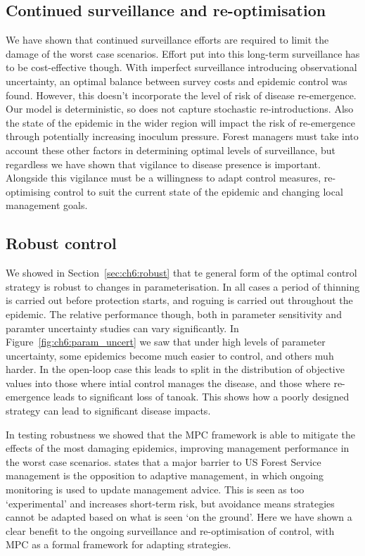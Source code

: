 \subsection{Continued surveillance and re-optimisation}

We have shown that continued surveillance efforts are required to limit the damage of the worst case scenarios. Effort put into this long-term surveillance has to be cost-effective though. With imperfect surveillance introducing observational uncertainty, an optimal balance between survey costs and epidemic control was found. However, this doesn't incorporate the level of risk of disease re-emergence. Our model is deterministic, so does not capture stochastic re-introductions. Also the state of the epidemic in the wider region will impact the risk of re-emergence through potentially increasing inoculum pressure. Forest managers must take into account these other factors in determining optimal levels of surveillance, but regardless we have shown that vigilance to disease presence is important. Alongside this vigilance must be a willingness to adapt control measures, re-optimising control to suit the current state of the epidemic and changing local management goals.

\subsection{Robust control}

We showed in Section~\ref{sec:ch6:robust} that te general form of the optimal control strategy is robust to changes in parameterisation. In all cases a period of thinning is carried out before protection starts, and roguing is carried out throughout the epidemic. The relative performance though, both in parameter sensitivity and paramter uncertainty studies can vary significantly. In Figure~\ref{fig:ch6:param_uncert} we saw that under high levels of parameter uncertainty, some epidemics become much easier to control, and others muh harder. In the open-loop case this leads to split in the distribution of objective values into those where intial control manages the disease, and those where re-emergence leads to significant loss of tanoak. This shows how a poorly designed strategy can lead to significant disease impacts.

In testing robustness we showed that the MPC framework is able to mitigate the effects of the most damaging epidemics, improving management performance in the worst case scenarios. \citet{maccleery_reinventing_2015} states that a major barrier to US Forest Service management is the opposition to adaptive management, in which ongoing monitoring is used to update management advice. This is seen as too `experimental' and increases short-term risk, but avoidance means strategies cannot be adapted based on what is seen `on the ground'. Here we have shown a clear benefit to the ongoing surveillance and re-optimisation of control, with MPC as a formal framework for adapting strategies.

